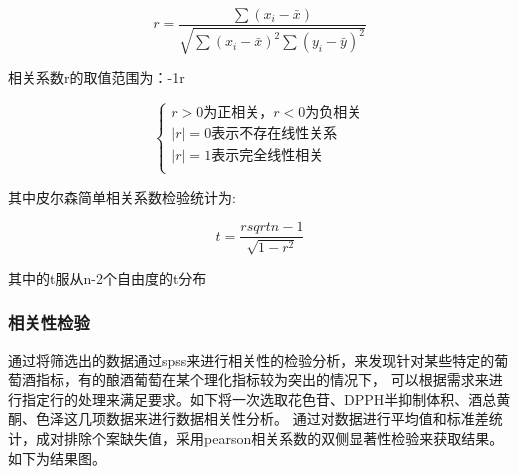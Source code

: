 \documentclass[UTF8]{ctexart}
\begin{document}
		   \begin{equation}
				r=\frac{\sum(x_i-\bar{x})}{\sqrt{\sum(x_i-\bar{x})^2 \sum(y_i-\bar{y})^2}}
		   \end{equation}
		   
		   相关系数r的取值范围为：-1\le r \le 1

		   \[\left\{\begin{array}{llcl}
				r>0为正相关，r<0为负相关\\

				\mid r \mid =0表示不存在线性关系\\

				\mid r \mid =1表示完全线性相关\\

		   \end{array} \right.\]

		   其中皮尔森简单相关系数检验统计为:

		   \begin{equation}
				t=\frac{r sqrt{n-1}}{\sqrt{1-r^2}}
		   \end{equation}

		   其中的t服从n-2个自由度的t分布

		   \subsubsection{相关性检验}
		   通过将筛选出的数据通过spss来进行相关性的检验分析，来发现针对某些特定的葡萄酒指标，有的酿酒葡萄在某个理化指标较为突出的情况下，
		   可以根据需求来进行指定行的处理来满足要求。如下将一次选取花色苷、DPPH半抑制体积、酒总黄酮、色泽这几项数据来进行数据相关性分析。
		   通过对数据进行平均值和标准差统计，成对排除个案缺失值，采用pearson相关系数的双侧显著性检验来获取结果。如下为结果图。
		
		   

			
\end{document}
